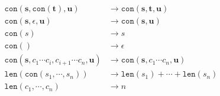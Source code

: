 \begin{figure}
\begin{align*}
\texttt{con}(\mathbf{s},  \texttt{con}(\mathbf{t}), \mathbf{u}) &\rightarrow   \texttt{con}(\mathbf{s},\mathbf{t}, \mathbf{u})\\
\texttt{con}(\mathbf{s}, \epsilon, \mathbf{u}) &\rightarrow \texttt{con}(\mathbf{s}, \mathbf{u})\\
\texttt{con}(s) &\rightarrow s\\
\texttt{con}() &\rightarrow \epsilon\\
\texttt{con}(\mathbf{s}, c_1 \cdots c_i, c_{i+1} \cdots c_n, \mathbf{u}) &\rightarrow \texttt{con}(\mathbf{s}, c_1 \cdots c_n, \mathbf{u})\\
\texttt{len}( \texttt{con}(s_1,\cdots,s_n)) &\rightarrow \texttt{len}(s_1) + \cdots + \texttt{len}(s_n)\\
\texttt{len}(c_1,\cdots,c_n) &\rightarrow n
\end{align*}
\end{figure}